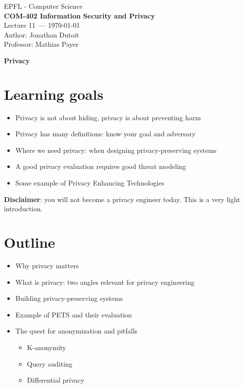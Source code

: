 \documentclass[11pt]{article}
\newcommand{\coursename}{COM-402 Information Security and Privacy}
\newcommand{\lecturenum}{11}
\newcommand{\lecturedate}{\today}
\newcommand{\professor}{Mathias Payer}
\begin{document}
\begin{center}
  {\large EPFL - Computer Science} \\[0.5em]
  {\Large \textbf{\coursename}} \\[0.5em]
  {\large Lecture \lecturenum\ --- \lecturedate} \\[0.5em]
  {\large Author: Jonathan Dutoit} \\[0.5em]
  {\large Professor: \professor} \\[0.5em]
\end{center}

\vspace{2cm}

\begin{center}
  {\LARGE \textbf{Privacy}}
\end{center}

\vspace{1cm}

\section*{Learning goals}
\begin{itemize}
	\item Privacy is not about hiding, privacy is about preventing harm
	\item Privacy has many definitions: know your goal and adversary
	\item Where we need privacy: when designing privacy-preserving systems
	\item A good privacy evaluation requires good threat modeling
	\item Some example of Privacy Enhancing Technologies
\end{itemize}

\textbf{Disclaimer}: you will not become a privacy engineer today. This is a very light introduction.

\section*{Outline}

\begin{itemize}
	\item Why privacy matters
	\item What is privacy: two angles relevant for privacy engineering
	\item Building privacy-preserving systems
	\item Example of PETS and their evaluation
	\item The quest for anonymization and pitfalls
	\begin{itemize}
		\item K-anonymity
	\item Query auditing
	\item Differential privacy 
\end{itemize}
	
\end{itemize}
\end{document}
